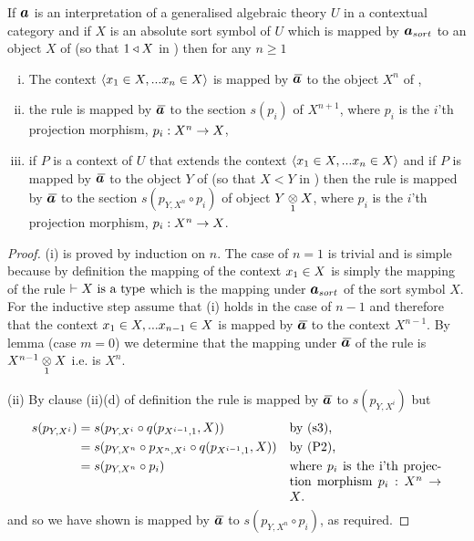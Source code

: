 \begin{lemma}
If $\iI$ is an interpretation of a generalised algebraic theory $U$ in a contextual category \catcw and if $X$ is an absolute sort symbol of $U$ which is mapped 
by $\iI_{sort}$ to an object $X$ of \catcw (so that $1 \base X$ in \catc) then for any $n \geq 1$ 
\begin{enumerate}[(i)]
\item
The context $\tuple{\ofT{x_1}{X},...\ofT{x_n}{X}}$ is mapped by $\Ibar$ to the object $X^n$ of \catc,
\item the rule 
 is mapped by $\Ibar$ to the section $s(p_i)$ of $X^{n+1}$, where $p_i$ is the $i$'th projection morphism, $p_i: X^n \morph X$,
\item if $P$ is a context of $U$ that extends the context $\tuple{\ofT{x_1}{X},...\ofT{x_n}{X}}$ and if $P$ is mapped by $\Ibar$ to
the object $Y$ of \catcw (so that $X < Y$ in \catc) then the rule 
 is mapped by $\Ibar$ to the section $s(p_{Y,X^n}\circ p_i)$ of object $\crossx{Y}{X}{1}$, where $p_i$ is the $i$'th projection morphism, $p_i: X^n \morph X$.
\end{enumerate}
\end{lemma}
\begin{proof}
(i) is proved by induction on $n$. The case of $n=1$ is trivial and is simple because by definition the mapping of the context $\ofT{x_1}{X}$ is simply the mapping of the rule $\tstyle \isT{X}$ which is the mapping under $\iI_{sort}$ of the sort symbol $X$. For the inductive step assume that (i) holds in the case of $n-1$ and therefore that the context $\ofT{x_1}{X},... \ofT{x_{n-1}}{X}$ is mapped by $\Ibar$ to the context $X^{n-1}$. 
By lemma  (case $m=0$) we determine that 
the mapping under $\Ibar$ of the rule  is $\crossx{X^{n-1}}{X}{1}$ i.e. is $X^n$.

(ii) By clause (ii)(d) of definition  
the rule  is mapped by $\Ibar$ to $s(p_{Y,X^i})$ but
\begin{align*}
s(p_{Y,X^i}) &= s(p_{Y,X^i} \circ q(p_{X^{i-1},1},X))                     &&\mbox{by (s3),}\\
             &= s(p_{Y,X^n} \circ p_{X^n,X^i} \circ q(p_{X^{i-1},1},X))   &&\mbox{by (P2),}\\
             &= s(p_{Y,X^n} \circ p_i)                                    &&\parbox[t]{4.2cm}{where $p_i$ is the i'th projection morphism $p_i:X^n \morph X$.}
\end{align*}
and so we have shown  is mapped by $\Ibar$ to $s(p_{Y,X^n}\circ p_i)$, as required.
\end{proof}